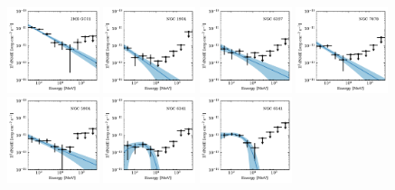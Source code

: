 \documentclass[doublespace,draft,nopageskip]{VTthesis} %
\begin{document}
\begin{appendices}
\begin{figure}
\centering
\includegraphics[width=0.24\textwidth]{Figures/Globular/spectra/PL_spectrum_0.pdf}
\includegraphics[width=0.24\textwidth]{Figures/Globular/spectra/PL_spectrum_4.pdf}
\includegraphics[width=0.24\textwidth]{Figures/Globular/spectra/PL_spectrum_16.pdf}
\includegraphics[width=0.24\textwidth]{Figures/Globular/spectra/PL_spectrum_26.pdf}
\includegraphics[width=0.24\textwidth]{Figures/Globular/spectra/PL_spectrum_7.pdf}
\includegraphics[width=0.24\textwidth]{Figures/Globular/spectra/PLE_spectrum_14.pdf}
\includegraphics[width=0.24\textwidth]{Figures/Globular/spectra/PLE_spectrum_21.pdf}

\end{figure}
\end{appendices}
\end{document}
